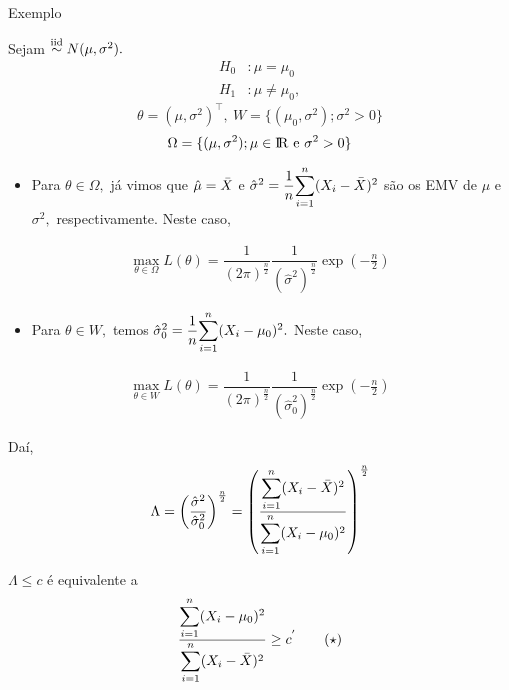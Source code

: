 \documentclass[12pt]{beamer}
\begin{document}
\begin{frame}{Exemplo}
\vspace{-0.2cm}
\begin{block}{}
\justifying
Sejam \seqX$\overset{\text{iid}}{\sim} N(\mu,\sigma^{2}).$
\begin{align*}
H_{0}&:\mu=\mu_{0}\\
H_{1}&:\mu\neq\mu_{0},
\end{align*}
$$\theta=(\mu,\sigma^{2})^{\top},~W=\{(\mu_{0},\sigma^{2});\sigma^{2}>0\}$$
$$\Omega=\{(\mu,\sigma^{2});\mu\in\rm I\!R~\text{e}~\sigma^{2}>0\}$$
\end{block}
\pause
\vspace{-0.1cm}
\begin{block}{}
\justifying
\begin{itemize}
    \item Para $\theta\in\Omega,$ já vimos que $\hat{\mu}=\Bar{X}$ e $\hat{\sigma}^{2}=\dfrac{1}{n}{\displaystyle \sum_{i=1}^{n}} (X_{i}-\Bar{X})^{2}$ são os EMV de $\mu$ e $\sigma^{2},$ respectivamente. Neste caso, 
\end{itemize}
\begin{align*}
    {\displaystyle \max_{\theta\in\Omega}L(\theta)=\dfrac{1}{(2\pi)^{\frac{n}{2}}}\dfrac{1}{(\hat{\sigma}^{2})^{\frac{n}{2}}}\exp{(-\frac{n}{2})}}
\end{align*}
\end{block}
\end{frame}

\begin{frame}{}
\begin{block}{}
\justifying
\begin{itemize}
    \item Para $\theta\in W,$ temos 
    $\hat{\sigma}_{0}^{2}=\dfrac{1}{n}{\displaystyle \sum_{i=1}^{n}} (X_{i}-\mu_{0})^{2}.$ Neste caso, 
\end{itemize}
\begin{align*}
    {\displaystyle \max_{\theta\in W}L(\theta)=\dfrac{1}{(2\pi)^{\frac{n}{2}}}\dfrac{1}{(\hat{\sigma}_{0}^{2})^{\frac{n}{2}}}\exp{(-\frac{n}{2})}}
\end{align*}
\end{block}
\end{frame}

\begin{frame}{}
\begin{block}{}
\justifying
Daí,
\begin{align*}
    \Lambda=\left(\dfrac{\hat{\sigma}^{2}}{\hat{\sigma}_{0}^{2}}\right)^{\frac{n}{2}}=\left(\dfrac{{\displaystyle \sum_{i=1}^{n}} (X_{i}-\Bar{X})^{2}}{{\displaystyle \sum_{i=1}^{n}} (X_{i}-\mu_{0})^{2}}\right)^{\frac{n}{2}}
\end{align*}
\end{block}
\pause
\begin{block}{}
\justifying
$\Lambda\leq c$ é equivalente a
\begin{align*}
    \dfrac{{\displaystyle \sum_{i=1}^{n}} (X_{i}-\mu_{0})^{2}}{{\displaystyle \sum_{i=1}^{n}} (X_{i}-\Bar{X})^{2}}\geq c^{'}\qquad (\star)
\end{align*}
\end{block}
\end{frame}
\end{document}
